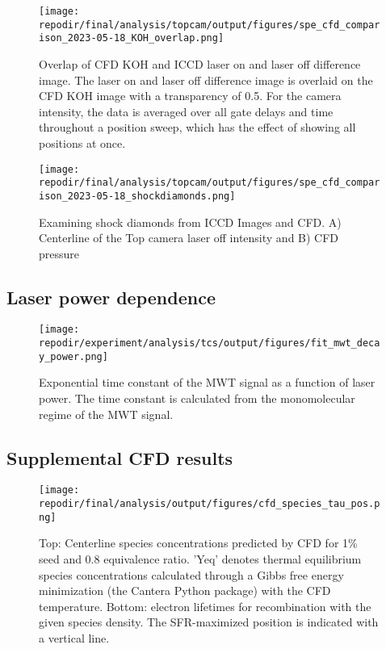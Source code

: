 \begin{figure}[]
\centering
\texttt{[image: \\repodir/final/analysis/topcam/output/figures/spe\_cfd\_comparison\_2023-05-18\_KOH\_overlap.png]}
\caption{Overlap of CFD KOH and ICCD laser on and laser off difference image. The laser on and laser off difference image is overlaid on the CFD KOH image with a transparency of 0.5. For the camera intensity, the data is averaged over all gate delays and time throughout a position sweep, which has the effect of showing all positions at once.}
\label{fig:SI_iccd_cfd_comparison_KOH_overlap}
\end{figure}

\begin{figure}
    \centering
    \texttt{[image: \\repodir/final/analysis/topcam/output/figures/spe\_cfd\_comparison\_2023-05-18\_shockdiamonds.png]} 
    \caption{Examining shock diamonds from ICCD Images and CFD. A) Centerline of the Top camera laser off intensity and B) CFD pressure}
    \label{fig:SI_iccd_cfd_comparison_KOH}
\end{figure}

\subsection{Laser power dependence}

\begin{figure}
    \centering
    \texttt{[image: \\repodir/experiment/analysis/tcs/output/figures/fit\_mwt\_decay\_power.png]} 
    \caption{Exponential time constant of the MWT signal as a function of laser power. The time constant is calculated from the monomolecular regime of the MWT signal.}
    \label{fig:SI_fit_mwt_decay_power}
\end{figure}

\clearpage

\subsection{Supplemental CFD results}

\begin{figure}[h]
    \texttt{[image: \\repodir/final/analysis/output/figures/cfd\_species\_tau\_pos.png]} 
    \caption{Top: Centerline species concentrations predicted by CFD for 1\% seed and 0.8 equivalence ratio. 'Yeq' denotes thermal equilibrium species concentrations calculated through a Gibbs free energy minimization (the Cantera Python package) with the CFD temperature.  Bottom:   
    electron lifetimes for recombination with the given species density. The SFR-maximized position is indicated with a vertical line.}
    \label{fig:SI_cfd_species_tau_pos}
\end{figure}



